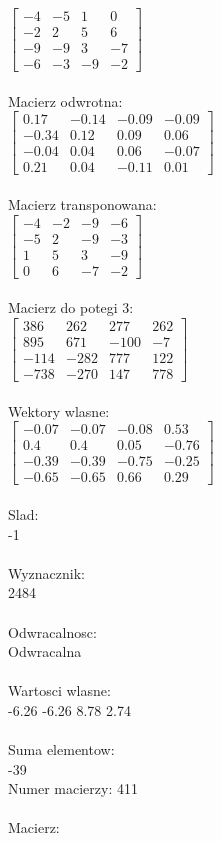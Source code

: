 \documentclass[a4paper,12pt]{article}
\begin{document}
$\begin{bmatrix} -4&-5&1&0\\-2&2&5&6\\-9&-9&3&-7\\-6&-3&-9&-2 \end{bmatrix}$
\\
\\
Macierz odwrotna:\\

$\begin{bmatrix} 0.17&-0.14&-0.09&-0.09\\-0.34&0.12&0.09&0.06\\-0.04&0.04&0.06&-0.07\\0.21&0.04&-0.11&0.01 \end{bmatrix}$
\\
\\
Macierz transponowana:\\

$\begin{bmatrix} -4&-2&-9&-6\\-5&2&-9&-3\\1&5&3&-9\\0&6&-7&-2 \end{bmatrix}$
\\
\\
Macierz do potegi 3:\\

$\begin{bmatrix} 386&262&277&262\\895&671&-100&-7\\-114&-282&777&122\\-738&-270&147&778 \end{bmatrix}$
\\
\\
Wektory wlasne:\\

$\begin{bmatrix} -0.07&-0.07&-0.08&0.53\\0.4&0.4&0.05&-0.76\\-0.39&-0.39&-0.75&-0.25\\-0.65&-0.65&0.66&0.29 \end{bmatrix}$
\\
\\
Slad:\\
-1
\\
\\
Wyznacznik:\\
2484
\\
\\
Odwracalnosc:\\
Odwracalna
\\
\\
Wartosci wlasne:\\
-6.26 -6.26 8.78 2.74
\\
\\
Suma elementow:\\
-39
\\
\newpage
Numer macierzy:
411
\\
\\
Macierz:\\
\end{document}
